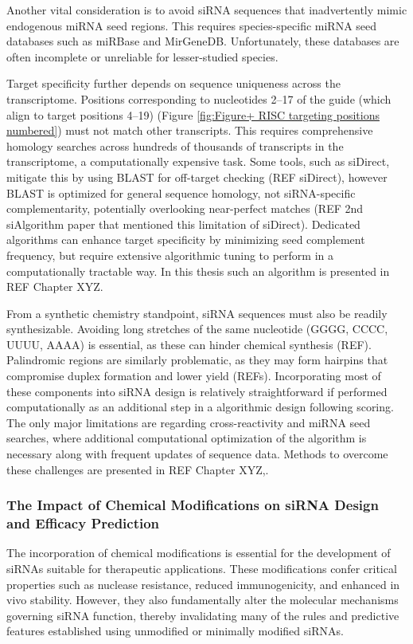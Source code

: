 \documentclass{report}
\begin{document}
Another vital consideration is to avoid siRNA sequences that inadvertently mimic endogenous miRNA seed regions. This requires species-specific miRNA seed databases such as miRBase and MirGeneDB. Unfortunately, these databases are often incomplete or unreliable for lesser-studied species.

Target specificity further depends on sequence uniqueness across the transcriptome. Positions corresponding to nucleotides 2–17 of the guide (which align to target positions 4–19) (Figure \ref{fig:Figure+ RISC targeting positions numbered}) must not match other transcripts. This requires comprehensive homology searches across hundreds of thousands of transcripts in the transcriptome, a computationally expensive task. Some tools, such as siDirect, mitigate this by using BLAST for off-target checking (REF siDirect), however BLAST is optimized for general sequence homology, not siRNA-specific complementarity, potentially overlooking near-perfect matches (REF 2nd siAlgorithm paper that mentioned this limitation of siDirect). Dedicated algorithms can enhance target specificity by minimizing seed complement frequency, but require extensive algorithmic tuning to perform in a computationally tractable way. In this thesis such an algorithm is presented in REF Chapter XYZ.

From a synthetic chemistry standpoint, siRNA sequences must also be readily synthesizable. Avoiding long stretches of the same nucleotide (GGGG, CCCC, UUUU, AAAA) is essential, as these can hinder chemical synthesis (REF). Palindromic regions are similarly problematic, as they may form hairpins that compromise duplex formation and lower yield (REFs).
Incorporating most of these components into siRNA design is relatively straightforward if performed computationally as an additional step in a algorithmic design following scoring. The only major limitations are regarding cross-reactivity and miRNA seed searches, where additional computational optimization of the algorithm is necessary along with frequent updates of sequence data. Methods to overcome these challenges are presented in REF Chapter XYZ,.


\subsubsection{The Impact of Chemical Modifications on siRNA Design and Efficacy Prediction}
The incorporation of chemical modifications is essential for the development of siRNAs suitable for therapeutic applications. These modifications confer critical properties such as nuclease resistance, reduced immunogenicity, and enhanced in vivo stability. However, they also fundamentally alter the molecular mechanisms governing siRNA function, thereby invalidating many of the rules and predictive features established using unmodified or minimally modified siRNAs.
\end{document}
